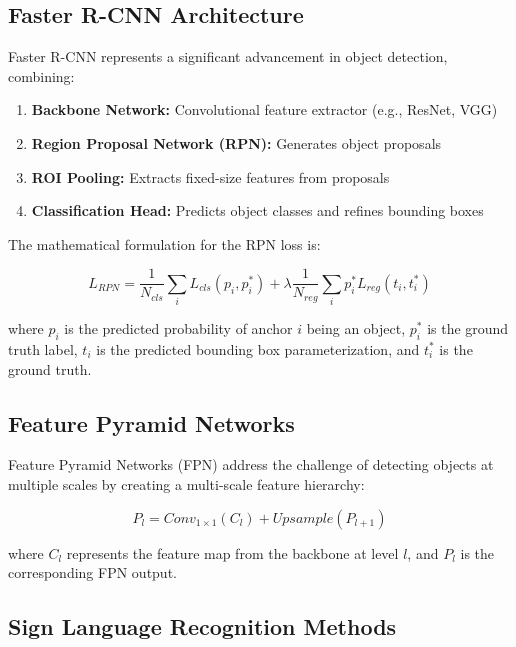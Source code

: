 \documentclass[12pt,a4paper]{article}
\begin{document}
\subsection{Faster R-CNN Architecture}

Faster R-CNN represents a significant advancement in object detection, combining:

\begin{enumerate}
    \item \textbf{Backbone Network:} Convolutional feature extractor (e.g., ResNet, VGG)
    \item \textbf{Region Proposal Network (RPN):} Generates object proposals
    \item \textbf{ROI Pooling:} Extracts fixed-size features from proposals
    \item \textbf{Classification Head:} Predicts object classes and refines bounding boxes
\end{enumerate}

The mathematical formulation for the RPN loss is:

\begin{equation}
    L_{RPN} = \frac{1}{N_{cls}} \sum_i L_{cls}(p_i, p_i^*) + \lambda \frac{1}{N_{reg}} \sum_i p_i^* L_{reg}(t_i, t_i^*)
\end{equation}

where $p_i$ is the predicted probability of anchor $i$ being an object, $p_i^*$ is the ground truth label, $t_i$ is the predicted bounding box parameterization, and $t_i^*$ is the ground truth.

\subsection{Feature Pyramid Networks}

Feature Pyramid Networks (FPN) \cite{lin2017fpn} address the challenge of detecting objects at multiple scales by creating a multi-scale feature hierarchy:

\begin{equation}
    P_l = Conv_{1\times1}(C_l) + Upsample(P_{l+1})
\end{equation}

where $C_l$ represents the feature map from the backbone at level $l$, and $P_l$ is the corresponding FPN output.

\subsection{Sign Language Recognition Methods}
\end{document}
